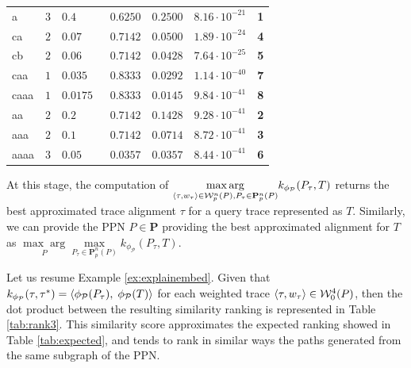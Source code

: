\begin{table}[!t]
\begin{tabular}{lc|ll|cc|l}
	\midrule
	{a}  & $3$ & $0.4$ & $\;\; 0.6250$  & $0.2500$ & $8.16\cdot 10^{-21}$ & \textbf{\color{blue}1}\\
	{ca}  & $2$ & $0.07$ & $\;\; 0.7142$ & $0.0500$ & $1.89\cdot 10^{-24}$ & \textbf{\color{blue}4}\\
	{cb}  & $2$ & $0.06$ & $\;\; 0.7142$ & $0.0428$ & $7.64\cdot 10^{-25}$ & \textbf{\color{blue}5}\\
	{caa}  & $1$ & $0.035$ & $\;\; 0.8333$ & $0.0292$ & $1.14\cdot 10^{-40}$ & \textbf{\color{blue}7}\\
	{caaa}  & $1$  & $0.0175$ & $\;\; 0.8333$ & $0.0145$ & $9.84\cdot 10^{-41}$ & \textbf{\color{blue}8}\\
	{aa}  & $2$ & $0.2$ & $\;\; 0.7142$ & $0.1428$ & $9.28\cdot 10^{-41}$ & \textbf{\color{red}2}\\
	{aaa}  & $2$ & $0.1$ & $\;\; 0.7142$ & $0.0714$ & $8.72\cdot 10^{-41}$ & \textbf{\color{red}3}\\
	{aaaa}  & $3$ & $0.05$ & $\;\; 0.0357$ & $0.0357$ & $8.44\cdot 10^{-41}$ & \textbf{\color{red}6}\\
	\bottomrule
\end{tabular}
\end{table}


At this stage, the computation of $\underset{\braket{\tau,w_\tau}\in \mathcal{W}_p^n(P), P_\tau\in\mathbf{P}_p^n(P)}{\max\arg} k_{\phi_\mathcal{P}}(P_\tau, T)$ returns the best approximated trace alignment $\tau$ for a query trace represented as $T$. Similarly, we can provide the PPN $P\in\mathbf{P}$ providing the best approximated alignment for $T$ as $\underset{P}{\max\arg}\underset{ P_\tau\in\mathbf{P}_p^n(P)}{\max} k_{\phi_\mathcal{P}}(P_\tau, T)$. 

\begin{example}
	Let us resume Example \ref{ex:explainembed}. 
	Given that $k_{\phi_{\mathcal{P}}}(\tau,\tau^*)=\braket{\phi_{\mathcal{P}}(P_\tau),\;\phi_{\mathcal{P}}(T)}$ for each weighted trace $\braket{\tau,w_\tau}\in\mathcal{W}_0^4(P)$, then the dot product between the resulting similarity ranking is represented in Table \ref{tab:rank3}. This similarity score approximates the expected ranking showed in Table \ref{tab:expected}, and tends to rank in similar ways the paths generated from the same subgraph of the PPN.
\end{example}



